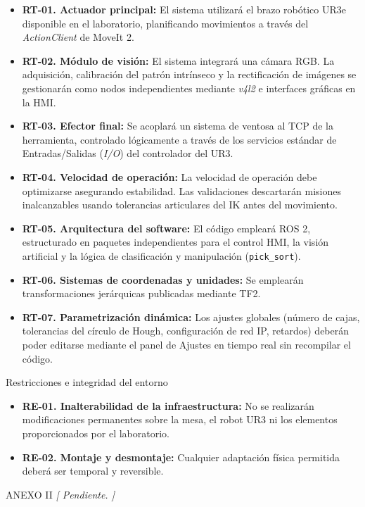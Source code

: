 \documentclass[12pt,a4paper]{article}
\makeatletter
\newcommand{\secfmt}[1]{%
  \noindent\colorbox{BlueHeader}{%
    \parbox[b]{\dimexpr\linewidth-2\fboxsep}{%
      \vspace{5pt}%
      \textcolor{white}{\large\bfseries #1}%
      \vspace{5pt}%
    }%
  }\par\vspace{4pt}%
}
\renewcommand\section{%
  \@ifstar\section@star\section@nostar
}
\newcommand\section@nostar[1]{%
  \refstepcounter{section}%
  \addcontentsline{toc}{section}{\protect\numberline{\thesection}#1}%
  \secfmt{\thesection.\enspace #1}%
}
\newcommand\section@star[1]{%
  \secfmt{#1}%
}
\newcommand{\subsecfmt}[1]{%
  {\large\bfseries\color{MediumBlue}#1}%
  \par\vspace{2pt}%
}
\renewcommand\subsection{%
  \@ifstar\subsection@star\subsection@nostar
}
\newcommand\subsection@nostar[1]{%
  \refstepcounter{subsection}%
  \addcontentsline{toc}{subsection}{\protect\numberline{\thesubsection}#1}%
  \vspace{10pt}%
  \subsecfmt{\thesubsection.\enspace #1}%
  \vspace{2pt}%
}
\newcommand\subsection@star[1]{%
  \vspace{10pt}\subsecfmt{#1}\vspace{2pt}%
}
\makeatother
\begin{document}
\begin{itemize}
    \item \textbf{RT-01. Actuador principal:} El sistema utilizará el brazo robótico UR3e disponible en el laboratorio, planificando movimientos a través del \textit{ActionClient} de MoveIt 2.
    \item \textbf{RT-02. Módulo de visión:} El sistema integrará una cámara RGB. La adquisición, calibración del patrón intrínseco y la rectificación de imágenes se gestionarán como nodos independientes mediante \textit{v4l2} e interfaces gráficas en la HMI.
    \item \textbf{RT-03. Efector final:} Se acoplará un sistema de ventosa al TCP de la herramienta, controlado lógicamente a través de los servicios estándar de Entradas/Salidas (\textit{I/O}) del controlador del UR3.
    \item \textbf{RT-04. Velocidad de operación:} La velocidad de operación debe optimizarse asegurando estabilidad. Las validaciones descartarán misiones inalcanzables usando tolerancias articulares del IK antes del movimiento.
    \item \textbf{RT-05. Arquitectura del software:} El código empleará ROS 2, estructurado en paquetes independientes para el control HMI, la visión artificial y la lógica de clasificación y manipulación (\texttt{pick\_sort}).
    \item \textbf{RT-06. Sistemas de coordenadas y unidades:} Se emplearán transformaciones jerárquicas publicadas mediante TF2.
    \item \textbf{RT-07. Parametrización dinámica:} Los ajustes globales (número de cajas, tolerancias del círculo de Hough, configuración de red IP, retardos) deberán poder editarse mediante el panel de Ajustes en tiempo real sin recompilar el código.
\end{itemize}

\subsection{Restricciones e integridad del entorno}

\begin{itemize}
    \item \textbf{RE-01. Inalterabilidad de la infraestructura:} No se realizarán modificaciones permanentes sobre la mesa, el robot UR3 ni los elementos proporcionados por el laboratorio.
    \item \textbf{RE-02. Montaje y desmontaje:} Cualquier adaptación física permitida deberá ser temporal y reversible.
\end{itemize}

\section{ANEXO II}
\textit{[ Pendiente. ]}
\end{document}
